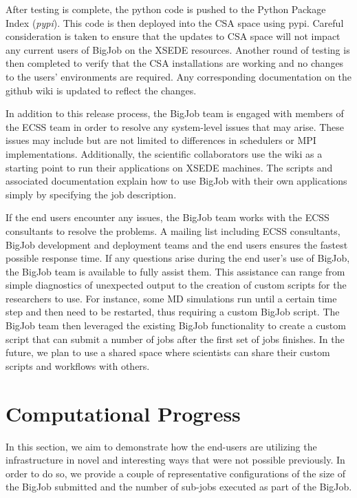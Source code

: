 \documentclass{sig-alternate}
\begin{document}
After testing is complete, the python code is pushed to the Python Package Index
(\textit{pypi}). This code is then deployed into the CSA space using pypi.
Careful consideration is taken to ensure that the updates to CSA space
will not impact any current users of BigJob on the XSEDE resources. Another round of testing 
is then completed to verify that the CSA installations are working and no changes to 
the users' environments are required. Any corresponding documentation on the 
github wiki is updated to reflect the changes.

In addition to this release process, the BigJob team is engaged with members
of the ECSS team in order to resolve any system-level issues that may arise.
These issues may include but are not limited to differences in schedulers or MPI
implementations. Additionally, the scientific collaborators use the wiki as a
starting point to run their applications on XSEDE machines. The scripts and
associated documentation explain how to use BigJob with their own applications
simply by specifying the job description. 

If the end users encounter any issues, the BigJob team works with the ECSS
consultants to resolve the problems. A mailing list including ECSS consultants,
BigJob development and deployment teams and the end users ensures the fastest
possible response time. If any questions arise during the end user's use of
BigJob, the BigJob team is available to fully assist them. This assistance can
range from simple diagnostics of unexpected output to  the creation of
custom scripts for the researchers to use. For instance, some MD simulations
run until a certain time step and then need to be restarted, thus requiring a
custom BigJob script. The BigJob team then leveraged the existing BigJob
functionality to create a custom script that can submit a number of jobs after
the first set of jobs finishes. In the future, we plan to use a shared space
where scientists can share their custom scripts and workflows with others.

\section{Computational Progress}
\label{sec:compprog}
In this section, we aim to demonstrate how the end-users are utilizing
the infrastructure in novel and interesting ways that were not
possible previously. In order to do so, we provide a couple of
representative configurations of the size of the BigJob submitted and the
number of sub-jobs executed as part of the BigJob.
\end{document}
